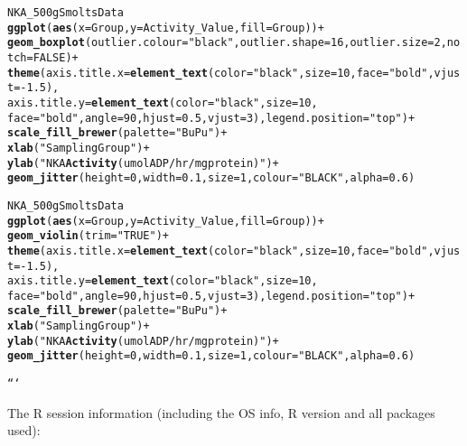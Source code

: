 \documentclass{article}\usepackage[]{graphicx}\usepackage[]{color}
\makeatletter
\newcommand{\hlstr}[1]{\textcolor[rgb]{0.192,0.494,0.8}{#1}}%
\newcommand{\hlkwd}[1]{\textcolor[rgb]{0.737,0.353,0.396}{\textbf{#1}}}%
\newenvironment{kframe}{%
 \def\at@end@of@kframe{}%
 \ifinner\ifhmode%
  \def\at@end@of@kframe{\end{minipage}}%
  \begin{minipage}{\columnwidth}%
 \fi\fi%
 \def\FrameCommand##1{\hskip\@totalleftmargin \hskip-\fboxsep
 \colorbox{shadecolor}{##1}\hskip-\fboxsep
     \hskip-\linewidth \hskip-\@totalleftmargin \hskip\columnwidth}%
 \MakeFramed {\advance\hsize-\width
   \@totalleftmargin\z@ \linewidth\hsize
   \@setminipage}}%
 {\par\unskip\endMakeFramed%
 \at@end@of@kframe}
\newenvironment{knitrout}{}{} %
\makeatother
\begin{document}
\begin{knitrout}
\begin{kframe}
\begin{alltt}
NKA_500gSmoltsData %>%  
  \hlkwd{ggplot}(\hlkwd{aes}(x = Group, y = Activity_Value, fill = Group)) +
  \hlkwd{geom_boxplot}(outlier.colour=\hlstr{"black"}, outlier.shape=16,outlier.size=2, notch=FALSE) +
  \hlkwd{theme}(axis.title.x = \hlkwd{element_text}(color=\hlstr{"black"}, size=10, face=\hlstr{"bold"}, vjust=-1.5),
  axis.title.y = \hlkwd{element_text}(color=\hlstr{"black"}, size=10, 
  face=\hlstr{"bold"}, angle=90, hjust=0.5, vjust=3), legend.position=\hlstr{"top"}) +
  \hlkwd{scale_fill_brewer}(palette=\hlstr{"BuPu"}) +
  \hlkwd{xlab}(\hlstr{"Sampling Group"}) +
  \hlkwd{ylab}(\hlstr{"NKA \hlkwd{Activity} (umol ADP/hr/mg protein)"}) + 
  \hlkwd{geom_jitter}(height = 0, width = 0.1, size=1, colour = \hlstr{"BLACK"}, alpha=0.6) 
  

NKA_500gSmoltsData %>%  
  \hlkwd{ggplot}(\hlkwd{aes}(x = Group, y = Activity_Value, fill = Group)) +
  \hlkwd{geom_violin}(trim=\hlstr{"TRUE"}) + 
  \hlkwd{theme}(axis.title.x = \hlkwd{element_text}(color=\hlstr{"black"}, size=10, face=\hlstr{"bold"}, vjust=-1.5),
  axis.title.y = \hlkwd{element_text}(color=\hlstr{"black"}, size=10, 
  face=\hlstr{"bold"}, angle=90, hjust=0.5, vjust=3), legend.position=\hlstr{"top"}) +
  \hlkwd{scale_fill_brewer}(palette=\hlstr{"BuPu"}) +
  \hlkwd{xlab}(\hlstr{"Sampling Group"}) +
  \hlkwd{ylab}(\hlstr{"NKA \hlkwd{Activity} (umol ADP/hr/mg protein)"}) + 
  \hlkwd{geom_jitter}(height = 0, width = 0.1, size=1, colour = \hlstr{"BLACK"}, alpha=0.6) 
  
```
\end{alltt}


{\ttfamily\noindent\bfseries{}}\end{kframe}
\end{knitrout}

The R session information (including the OS info, R version and all
packages used):
\end{document}
